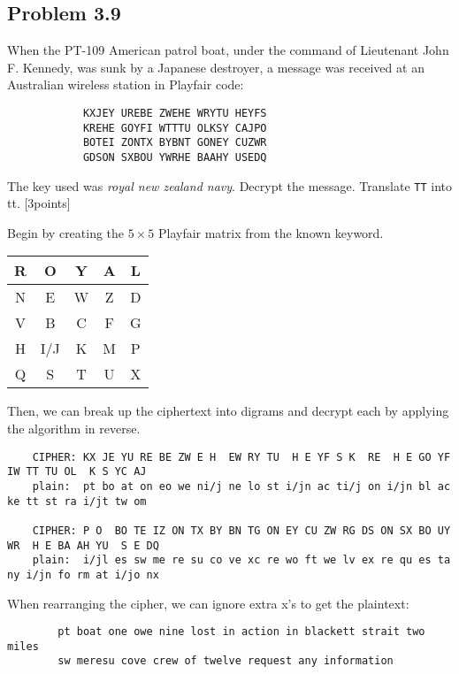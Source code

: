 \documentclass[../hw_sols.tex]{subfiles}
\begin{document}
\newpage



\subsection*{Problem 3.9}

When the PT-109 American patrol boat, under the command of Lieutenant John F. 
Kennedy, was sunk by a Japanese destroyer, a message was received at an 
Australian wireless station in Playfair code:
\begin{verbatim}
            KXJEY UREBE ZWEHE WRYTU HEYFS
            KREHE GOYFI WTTTU OLKSY CAJPO
            BOTEI ZONTX BYBNT GONEY CUZWR
            GDSON SXBOU YWRHE BAAHY USEDQ
\end{verbatim}

\noindent The key used was \textit{royal new zealand navy}. Decrypt the 
message. Translate \verb|TT| into tt. [3points]

\begin{solution}

Begin by creating the $5 \times 5$ Playfair matrix from the known keyword.
	\begin{center}
	\begin{tabular}{ | c | c | c | c | c | }
		\hline \rowcolor{cyan!40}
		R & O & Y & A & L \\
		\hline \rowcolor{cyan!40}
		N & E & W & Z & D \\
		\hline
		\cellcolor{cyan!40} V & B & C & F & G \\
		\hline
		H & I/J & K & M & P \\
		\hline
		Q &   S & T & U & X \\
		\hline
	\end{tabular}
	\end{center}

\noindent Then, we can break up the ciphertext into digrams and decrypt each 
by applying the algorithm in reverse.
\begin{verbatim}
	CIPHER: KX JE YU RE BE ZW E H  EW RY TU  H E YF S K  RE  H E GO YF IW TT TU OL  K S YC AJ
	plain:  pt bo at on eo we ni/j ne lo st i/jn ac ti/j on i/jn bl ac ke tt st ra i/jt tw om

	CIPHER: P O  BO TE IZ ON TX BY BN TG ON EY CU ZW RG DS ON SX BO UY WR  H E BA AH YU  S E DQ
	plain:  i/jl es sw me re su co ve xc re wo ft we lv ex re qu es ta ny i/jn fo rm at i/jo nx
\end{verbatim}

\noindent When rearranging the cipher, we can ignore extra x's to get the 
plaintext:
\begin{verbatim}
	    pt boat one owe nine lost in action in blackett strait two miles
	    sw meresu cove crew of twelve request any information
\end{verbatim}

\end{solution}
\end{document}
